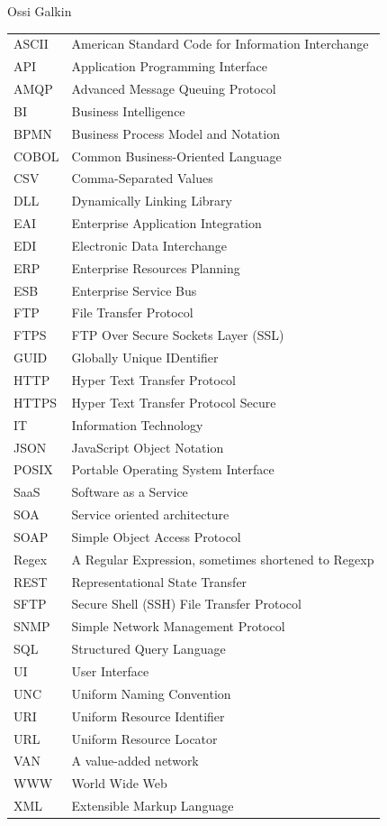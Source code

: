 \documentclass[english, 12pt, a4paper, sci, utf8, a-2b, online, obeyspaces]{aaltothesis}
\begin{document}
\vspace{5mm}
{\hfill Ossi Galkin \hspace{1cm}}
\newpage
\thesistableofcontents
\begin{tabular}{ll}
ASCII   & American Standard Code for Information Interchange \\
API     & Application Programming Interface \\
AMQP    & Advanced Message Queuing Protocol \\
BI      & Business Intelligence \\ 
BPMN    & Business Process Model and Notation \\ 
COBOL   & Common Business-Oriented Language \\
CSV     & Comma-Separated Values \\
DLL     & Dynamically Linking Library \\
EAI     & Enterprise Application Integration \\
EDI     & Electronic Data Interchange \\
ERP     & Enterprise Resources Planning \\
ESB     & Enterprise Service Bus \\
FTP     & File Transfer Protocol \\
FTPS    & FTP Over Secure Sockets Layer (SSL) \\ 
GUID    & Globally Unique IDentifier \\
HTTP    & Hyper Text Transfer Protocol \\
HTTPS   & Hyper Text Transfer Protocol Secure \\
IT      & Information Technology \\
JSON    & JavaScript Object Notation \\
POSIX   & Portable Operating System Interface \\
SaaS    & Software as a Service \\
SOA     & Service oriented architecture \\
SOAP    & Simple Object Access Protocol \\
Regex   & A Regular Expression, sometimes shortened to Regexp \\
REST    & Representational State Transfer \\
SFTP    & Secure Shell (SSH) File Transfer Protocol \\
SNMP    & Simple Network Management Protocol \\
SQL     & Structured Query Language \\
UI      & User Interface \\
UNC     & Uniform Naming Convention \\
URI     & Uniform Resource Identifier \\
URL     & Uniform Resource Locator \\
VAN     & A value-added network \\
WWW     & World Wide Web \\
XML     & Extensible Markup Language
\end{tabular}
\end{document}
